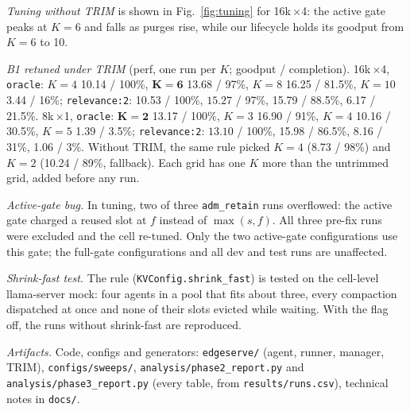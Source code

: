 \documentclass[conference]{IEEEtran}
\newcommand{\K}{$K$}
\newcommand{\x}{$\times$}
\newcommand{\cfg}[1]{\texttt{#1}}
\begin{document}
\medskip
\noindent\emph{Tuning without TRIM} is shown in Fig.~\ref{fig:tuning} for 16k\,\x4: the active gate
peaks at $K{=}6$ and falls as purges rise, while our lifecycle holds its goodput from $K{=}6$ to 10.

\medskip
\noindent\emph{B1 retuned under TRIM} (perf, one run per \K; goodput / completion). 16k\,\x4,
\cfg{oracle}: $K{=}4$ 10.14 / 100\%, $\mathbf{K{=}6}$ 13.68 / 97\%, $K{=}8$ 16.25 / 81.5\%, $K{=}10$
3.44 / 16\%; \cfg{relevance:2}: 10.53 / 100\%, $\mathbf{15.27}$ / 97\%, 15.79 / 88.5\%, 6.17 / 21.5\%.
8k\,\x1, \cfg{oracle}: $\mathbf{K{=}2}$ 13.17 / 100\%, $K{=}3$ 16.90 / 91\%, $K{=}4$ 10.16 / 30.5\%,
$K{=}5$ 1.39 / 3.5\%; \cfg{relevance:2}: $\mathbf{13.10}$ / 100\%, 15.98 / 86.5\%, 8.16 / 31\%, 1.06 /
3\%. Without TRIM, the same rule picked $K{=}4$ (8.73 / 98\%) and $K{=}2$ (10.24 / 89\%, fallback). Each
grid has one \K{} more than the untrimmed grid, added before any run.

\medskip
\noindent\emph{Active-gate bug.} In tuning, two of three \cfg{adm\_retain} runs overflowed: the
active gate charged a reused slot at $f$ instead of $\max(s,f)$. All three pre-fix runs were
excluded and the cell re-tuned. Only the two active-gate configurations use this gate; the full-gate
configurations and all dev and test runs are unaffected.

\medskip
\noindent\emph{Shrink-fast test.} The rule (\texttt{KVConfig.shrink\_fast}) is tested on the
cell-level llama-server mock: four agents in a pool that fits about three, every compaction dispatched
at once and none of their slots evicted while waiting. With the flag off, the runs without shrink-fast
are reproduced.

\medskip
\noindent\emph{Artifacts.} Code, configs and generators: \texttt{edgeserve/} (agent, runner, manager,
TRIM), \texttt{configs/sweeps/}, \texttt{analysis/phase2\_report.py} and
\texttt{analysis/phase3\_report.py} (every table, from \texttt{results/runs.csv}), technical notes
in \texttt{docs/}.
\end{document}
